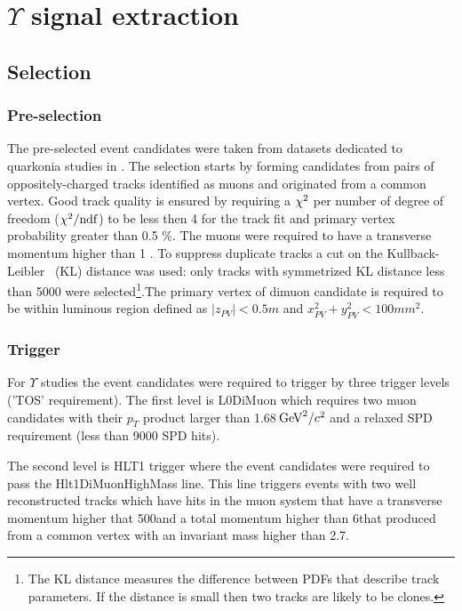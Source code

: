 \section{\texorpdfstring{$\Upsilon$}{Y} signal extraction}
\label{sec:upsilon}

\subsection{Selection}
\label{sec:ups:selelection}
\subsubsection{Pre-selection}
\label{sec:upsilon:selelection:preselection}
The pre-selected event candidates were taken from datasets dedicated to
quarkonia studies in \lhcb. The selection starts by forming candidates from
pairs of oppositely-charged tracks identified as muons and originated from a
common vertex. Good track quality is ensured by requiring a $\chi^2$ per number
of degree of freedom ($\chi^2/\rm{ndf}$) to be less then 4 for the track fit
and primary vertex probability greater than 0.5 \%. The muons were required to
have a transverse momentum higher than 1 \gevc. To suppress duplicate tracks a
cut on the Kullback-Leibler~\cite{Needham:1082460} (KL) distance was used: only
tracks with symmetrized KL distance less than 5000 were selected\footnote{The
KL distance measures the difference between PDFs that describe track
parameters. If the distance is small then two tracks are likely to be
clones.}.The primary vertex of dimuon candidate is required to be within
luminous region defined as $|z_{PV}| < 0.5 m$ and $x_{PV}^2 + y_{PV}^2 < 100
mm^2$.
\subsubsection{Trigger}
\label{sec:upsilon:selection:trigger}

For $\Upsilon$ studies the event candidates  were required to trigger by three
trigger levels ('TOS' requirement). The first level is L0DiMuon which  requires
two muon candidates with their $p_T$ product larger than 1.68$\mathrm{\,Ge\kern -0.1em V}^2/c^2$ and
a relaxed SPD requirement (less than 9000 SPD hits).

The second level is HLT1 trigger where the event candidates were required to
pass the Hlt1DiMuonHighMass line.
This line triggers events with  two well reconstructed tracks  which have hits
in the muon system  that have a transverse momentum higher that 500\mevc and 
a total momentum higher than 6\gevc that produced from a common vertex with
an invariant mass higher than 2.7\gevcc.


